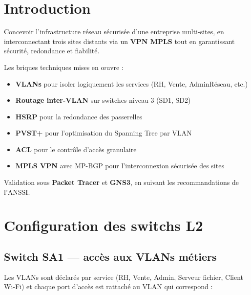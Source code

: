 \documentclass[11pt,a4paper]{article}
\begin{document}
\setcounter{page}{1}

{\sffamily
\hypersetup{linkcolor=primary}
\renewcommand{\contentsname}{\textcolor{accent}{\faList~} Sommaire}
\tableofcontents
}
\vspace{0.4cm}

\section{Introduction}

\begin{infobox}[title={\faBullseye~Mission SAE 3.Cyber 03}]
Concevoir l'infrastructure réseau sécurisée d'une entreprise multi-sites, en interconnectant trois sites distants via un \textbf{VPN MPLS} tout en garantissant sécurité, redondance et fiabilité.
\end{infobox}

\noindent Les briques techniques mises en \oe{}uvre :
\begin{itemize}
  \item \textbf{VLANs} pour isoler logiquement les services (RH, Vente, AdminRéseau, etc.)
  \item \textbf{Routage inter-VLAN} sur switches niveau 3 (SD1, SD2)
  \item \textbf{HSRP} pour la redondance des passerelles
  \item \textbf{PVST+} pour l'optimisation du Spanning Tree par VLAN
  \item \textbf{ACL} pour le contrôle d'accès granulaire
  \item \textbf{MPLS VPN} avec MP-BGP pour l'interconnexion sécurisée des sites
\end{itemize}

Validation sous \textbf{Packet Tracer} et \textbf{GNS3}, en suivant les recommandations de l'ANSSI.

\section{Configuration des switchs L2}

\subsection{Switch SA1 — accès aux VLANs métiers}

Les VLANs sont déclarés par service (RH, Vente, Admin, Serveur fichier, Client Wi-Fi) et chaque port d'accès est rattaché au VLAN qui correspond :
\end{document}
